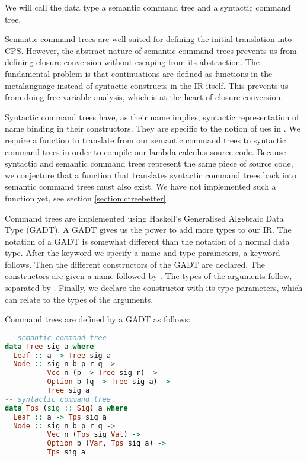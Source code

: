 We will call the data type  a semantic command tree and  a syntactic command tree.

Semantic command trees are well suited for defining the initial translation into CPS. However, the abstract nature of semantic command trees prevents us from defining closure conversion without escaping from its abstraction. The fundamental problem is that continuations are defined as functions in the metalanguage instead of syntactic constructs in the IR itself. This prevents us from doing free variable analysis, which is at the heart of closure conversion.

Syntactic command trees have, as their name implies, syntactic representation of name binding in their constructors. They are specific to the notion of ues in . We require a function to translate from our semantic command trees to syntactic command trees in order to compile our lambda calculus source code. Because syntactic and semantic command trees represent the same piece of source code, we conjecture that a function that translates syntactic command trees back into semantic command trees must also exist. We have not implemented such a function yet, see section \ref{section:ctreebetter}.

Command trees are implemented using Haskell's Generalised Algebraic Data Type (GADT). A GADT gives us the power to add more types to our IR. The notation of a GADT is somewhat different than the notation of a normal data type. After the  keyword we specify a name and type parameters, a  keyword follows. Then the different constructors of the GADT are declared. The constructors are given a name followed by \icode{::}. The types of the arguments follow, separated by \icode{->}. Finally, we declare the constructor with its type parameters, which can relate to the types of the arguments.

Command trees are defined by a GADT as follows:

\begin{lstlisting}[language=Haskell]
-- semantic command tree
data Tree sig a where
  Leaf :: a -> Tree sig a
  Node :: sig n b p r q ->
          Vec n (p -> Tree sig r) ->
          Option b (q -> Tree sig a) ->
          Tree sig a
-- syntactic command tree
data Tps (sig :: Sig) a where
  Leaf :: a -> Tps sig a
  Node :: sig n b p r q ->
          Vec n (Tps sig Val) ->
          Option b (Var, Tps sig a) ->
          Tps sig a
\end{lstlisting}

